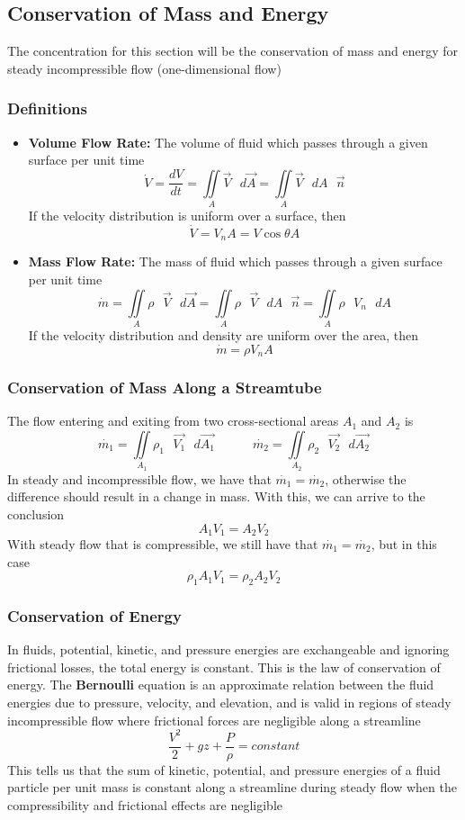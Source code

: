 \documentclass[11pt]{article}
\begin{document}
\subsection{Conservation of Mass and Energy}
The concentration for this section will be the conservation of mass and energy for steady incompressible flow (one-dimensional flow)

\subsubsection{Definitions}
\begin{itemize}
\item  \textbf{Volume Flow Rate:} The volume of fluid which passes through a given surface per unit time 
$$ \dot{V} = \frac{dV}{dt} =  \iint\limits_{A} \vec{V} \text{ } d\vec{A}  = \iint\limits_{A} \vec{V} \text{ } dA \text{ } \vec{n} $$
If the velocity distribution is uniform over a surface, then
$$\dot{V} = V_nA = V \cos \theta A$$
\item \textbf{Mass Flow Rate:} The mass of fluid which passes through a given surface per unit time
$$ \dot{m} = \iint\limits_{A} \rho \text{ } \vec{V}  \text{ } d\vec{A}  = \iint\limits_{A} \rho \text{ } \vec{V} \text{ } dA \text{ } \vec{n} = \iint \limits_A \rho \text{ } V_n \text{ } dA $$
If the velocity distribution and density are uniform over the area, then
$$ \dot{m} = \rho V_n A$$
\end{itemize}

\subsubsection{Conservation of Mass Along a Streamtube}
The flow entering and exiting from two cross-sectional areas $A_1$ and $A_2$ is $$ \dot{m_1} = \iint\limits_{A_1} \rho_1 \text{ } \vec{V_1}  \text{ } d\vec{A_1} \quad \quad \quad \dot{m_2} = \iint\limits_{A_2} \rho_2 \text{ } \vec{V_2}  \text{ } d\vec{A_2}$$ In steady and incompressible flow, we have that $\dot{m_1} = \dot{m_2}$, otherwise the difference should result in a change in mass. With this, we can arrive to the conclusion 
$$ A_1V_1 = A_2V_2$$ With steady flow that is compressible, we still have that $\dot{m_1} = \dot{m_2}$, but in this case 
$$ \rho_1A_1V_1 = \rho_2A_2V_2$$

\subsubsection{Conservation of Energy}
In fluids, potential, kinetic, and pressure energies are exchangeable and ignoring frictional losses, the total energy is constant. This is the law of conservation of energy. The \textbf{Bernoulli} equation is an approximate relation between the fluid energies due to pressure, velocity, and elevation, and is valid in regions of steady incompressible flow where frictional forces are negligible along a streamline
$$ \frac{V^2}{2}+gz+ \frac{P}{\rho} = constant$$
This tells us that the sum of kinetic, potential, and pressure energies of a fluid particle per unit mass is constant along a streamline during steady flow when the compressibility and frictional effects are negligible
\end{document}

